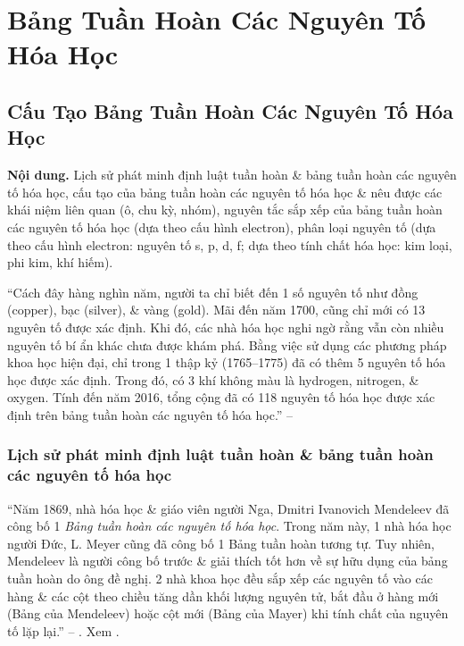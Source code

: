 \documentclass{article}
\numberwithin{equation}{section}
\begin{document}

\section{Bảng Tuần Hoàn Các Nguyên Tố Hóa Học}

\subsection{Cấu Tạo Bảng Tuần Hoàn Các Nguyên Tố Hóa Học}
\textsf{\textbf{Nội dung.} Lịch sử phát minh định luật tuần hoàn \& bảng tuần hoàn các nguyên tố hóa học, cấu tạo của bảng tuần hoàn các nguyên tố hóa học \& nêu được các khái niệm liên quan (ô, chu kỳ, nhóm), nguyên tắc sắp xếp của bảng tuần hoàn các nguyên tố hóa học (dựa theo cấu hình electron), phân loại nguyên tố (dựa theo cấu hình electron: nguyên tố s, p, d, f; dựa theo tính chất hóa học: kim loại, phi kim, khí hiếm).}

``Cách đây hàng nghìn năm, người ta chỉ biết đến 1 số nguyên tố như đồng (copper), bạc (silver), \& vàng (gold). Mãi đến năm 1700, cũng chỉ mới có 13 nguyên tố được xác định. Khi đó, các nhà hóa học nghi ngờ rằng vẫn còn nhiều nguyên tố bí ẩn khác chưa được khám phá. Bằng việc sử dụng các phương pháp khoa học hiện đại, chỉ trong 1 thập kỷ (1765--1775) đã có thêm 5 nguyên tố hóa học được xác định. Trong đó, có 3 khí không màu là hydrogen, nitrogen, \& oxygen. Tính đến năm 2016, tổng cộng đã có 118 nguyên tố hóa học được xác định trên bảng tuần hoàn các nguyên tố hóa học.'' -- \cite[p. 33]{SGK_Hoa_Hoc_10_Chan_Troi_Sang_Tao}

\subsubsection{Lịch sử phát minh định luật tuần hoàn \& bảng tuần hoàn các nguyên tố hóa học}
``Năm 1869, nhà hóa học \& giáo viên người Nga, Dmitri Ivanovich Mendeleev đã công bố 1 \textit{Bảng tuần hoàn các nguyên tố hóa học}. Trong năm này, 1 nhà hóa học người Đức, L. Meyer cũng đã công bố 1 Bảng tuần hoàn tương tự. Tuy nhiên, Mendeleev là người công bố trước \& giải thích tốt hơn về sự hữu dụng của bảng tuần hoàn do ông đề nghị. 2 nhà khoa học đều sắp xếp các nguyên tố vào các hàng \& các cột theo chiều tăng dần khối lượng nguyên tử, bắt đầu ở hàng mới (Bảng của Mendeleev) hoặc cột mới (Bảng của Mayer) khi tính chất của nguyên tố lặp lại.'' -- \cite[pp. 33--34]{SGK_Hoa_Hoc_10_Chan_Troi_Sang_Tao}. Xem \cite[Hình 5.1: \textsf{Bảng tuần hoàn các nguyên tố hóa học của Mendeleev (1869)}, p. 34]{SGK_Hoa_Hoc_10_Chan_Troi_Sang_Tao}.
\end{document}
